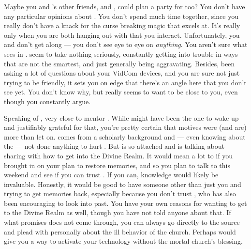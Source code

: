 \documentclass[char]{GL2020}
\begin{document}
Maybe you and \cDisney{}'s other friends, \cAdopted{\full} and \cPirateChild{\full}, could plan a party for \cDisney{\them} too? You don’t have any particular opinions about \cAdopted{}. You don’t spend much time together, since you really don’t have a knack for the curse breaking magic that \cAdopted{} excels at. It’s really only when you are both hanging out with \cDisney{} that you interact. Unfortunately, you and \cPirateChild{} don't get along — you don't see eye to eye on \emph{anything}. You aren't sure what \cDisney{} sees in \cPirateChild{\them}. \cPirateChild{\They} seem\cPirateChild{\verbs} to take nothing seriously, constantly getting into trouble in ways that are not the smartest, and just generally being aggravating. Besides, \cPirateChild{\theyhave} been asking a lot of questions about your VidCom devices, and you are sure \cPirateChild{\theyare} not just trying to be friendly, it sets you on edge that there’s an angle here that you don’t see yet. You don’t know why, but \cPirateChild{} really seems to want to be close to you, even though you constantly argue.

Speaking of \cDisney{}, \cDisney{\theyare} very close to \cDisney{\their} mentor \cWildCard{\full}. While \cWildCard{} might have been the one to wake \cDisney{} up and \cDisney{\theyare} justifiably grateful for that, you're pretty certain that \cWildCard{\their} motives were (and are) more than \cWildCard{\they} let\cWildCard{\verbs} on.  \cWildCard{} comes from a scholarly background and — even knowing about the \cDisneySect{} — \cWildCard{\they \have} not done anything to hurt \cDisney{}. But \cDisney{} is so attached and is talking about sharing with \cWildCard{} how to get into the Divine Realm. It would mean a lot to \cDisney{} if you brought \cWildCard{} in on your plan to restore \cDisney{\their} memories, and so you plan to talk to \cWildCard{\them} this weekend and see if you can trust \cWildCard{\them}. If you can, \cWildCard{\their} knowledge would likely be invaluable. Honestly, it would be good to have someone other than just you and \cDisney{} trying to get \cDisney{\their} memories back, especially because you don’t trust \cPirateChild{}, who has also been encouraging \cDisney{} to look into \cDisney{\their} past. You have your own reasons for wanting to get to the Divine Realm as well, though you have not told anyone about that. If what \cChupInventor{} promises does not come through, you can always go directly to the source and plead with \cTechGod{} personally about the ill behavior of the church. Perhaps \cTechGod{} would give you a way to activate your technology without the mortal church’s blessing.
\end{document}
